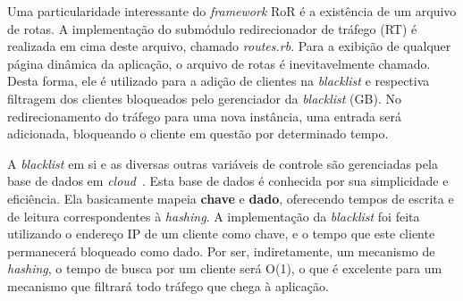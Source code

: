 Uma particularidade interessante do \emph{framework} RoR é a existência de um arquivo de rotas. A implementação do submódulo redirecionador de tráfego (RT) é realizada em cima deste arquivo, chamado \emph{routes.rb}. Para a exibição de qualquer página dinâmica da aplicação, o arquivo de rotas é inevitavelmente chamado. Desta forma, ele é utilizado para a adição de clientes na \emph{blacklist} e respectiva filtragem dos clientes bloqueados pelo gerenciador da \emph{blacklist} (GB). No redirecionamento do tráfego para uma nova instância, uma entrada será adicionada, bloqueando o cliente em questão por determinado tempo.


A \emph{blacklist} em si e as diversas outras variáveis de controle são gerenciadas pela base de dados em \emph{cloud}~\cite{redis}. Esta base de dados é conhecida por sua simplicidade e eficiência. Ela basicamente mapeia \textbf{chave} e \textbf{dado}, oferecendo tempos de escrita e de leitura correspondentes à \emph{hashing}. A implementação da \emph{blacklist} foi feita utilizando o endereço IP de um cliente como chave, e o tempo que este cliente permanecerá bloqueado como dado. Por ser, indiretamente, um mecanismo de \emph{hashing}, o tempo de busca por um cliente será O(1), o que é excelente para um mecanismo que filtrará todo tráfego que chega à aplicação. %

